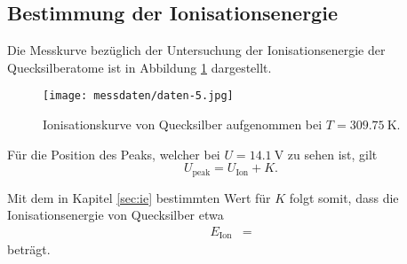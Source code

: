 \subsection{Bestimmung der Ionisationsenergie}
Die Messkurve bezüglich der Untersuchung der Ionisationsenergie der Quecksilberatome ist in Abbildung \ref{fig:abb2} dargestellt.

\begin{figure}[H]
  \centering
  \texttt{[image: messdaten/daten-5.jpg]}
  \caption{Ionisationskurve von Quecksilber aufgenommen bei $T = \SI{309.75}{\kelvin}$.}
  \label{fig:abb2}
\end{figure}

Für die Position des Peaks, welcher bei $U = \SI{14.1}{\volt}$ zu sehen ist, gilt
\begin{equation}
  U_{\text{peak}} = U_{\text{Ion}} + K.
\end{equation}

Mit dem in Kapitel \ref{sec:ie} bestimmten Wert für $K$ folgt somit, dass die Ionisationsenergie von Quecksilber etwa
\begin{align*}
  E_{\text{Ion}} &= 
\end{align*}
beträgt.
